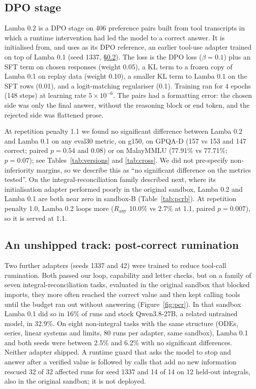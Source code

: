 \documentclass[11pt]{article}
\newcommand{\Rany}{R_{\text{any}}}
\begin{document}
\subsection{DPO stage}

Lamba 0.2 is a DPO \citep{rafailov2023dpo} stage on 406 preference pairs built from tool transcripts in which a runtime intervention had led the model to a correct answer. It is initialised from, and uses as its DPO reference, an earlier tool-use adapter trained on top of Lamba 0.1 (seed 1337, \S\ref{sec:pcr}). The loss is the DPO loss ($\beta=0.1$) plus an SFT term on chosen responses (weight 0.05), a KL term to a frozen copy of Lamba 0.1 on replay data (weight 0.10), a smaller KL term to Lamba 0.1 on the SFT rows (0.01), and a logit-matching regulariser (0.1). Training ran for 4 epochs (148 steps) at learning rate $5\times10^{-6}$. The pairs had a formatting error: the chosen side was only the final answer, without the reasoning block or end token, and the rejected side was flattened prose.

At repetition penalty 1.1 we found no significant difference between Lamba 0.2 and Lamba 0.1 on any eval30 metric, on g150, on GPQA-D (157 vs 153 and 147 correct; paired $p=0.54$ and $0.08$) or on MalayMMLU (77.91\% vs 77.71\%; $p=0.07$); see Tables~\ref{tab:versions} and \ref{tab:cross}. We did not pre-specify non-inferiority margins, so we describe this as ``no significant difference on the metrics tested''. On the integral-reconciliation family described next, where its initialisation adapter performed poorly in the original sandbox, Lamba 0.2 and Lamba 0.1 are both near zero in sandbox-B (Table~\ref{tab:pcrb}). At repetition penalty 1.0, Lamba 0.2 loops more ($\Rany$ 10.0\% vs 2.7\% at 1.1, paired $p=0.007$), so it is served at 1.1.

\subsection{An unshipped track: post-correct rumination}
\label{sec:pcr}

Two further adapters (seeds 1337 and 42) were trained to reduce tool-call rumination. Both passed our loop, capability and letter checks, but on a family of seven integral-reconciliation tasks, evaluated in the original sandbox that blocked imports, they more often reached the correct value and then kept calling tools until the budget ran out without answering (Figure~\ref{fig:pcr}). In that sandbox Lamba 0.1 did so in 16\% of runs and stock Qwen3.8-27B, a related untrained model, in 32.9\%. On eight non-integral tasks with the same structure (ODEs, series, linear systems and limits, 80 runs per adapter, same sandbox), Lamba 0.1 and both seeds were between 2.5\% and 6.2\% with no significant differences. Neither adapter shipped. A runtime guard that asks the model to stop and answer after a verified value is followed by calls that add no new information rescued 32 of 32 affected runs for seed 1337 and 14 of 14 on 12 held-out integrals, also in the original sandbox; it is not deployed.
\end{document}
